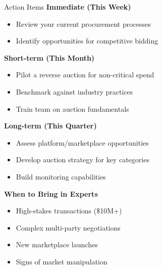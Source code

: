 \documentclass[xcolor={x11names}]{beamer}
\begin{document}
\begin{frame}{Action Items}
\textbf{Immediate (This Week)}
\begin{itemize}
  \item Review your current procurement processes
  \item Identify opportunities for competitive bidding
\end{itemize}


\textbf{Short-term (This Month)}
\begin{itemize}
  \item Pilot a reverse auction for non-critical spend
  \item Benchmark against industry practices
  \item Train team on auction fundamentals
\end{itemize}


\textbf{Long-term (This Quarter)}
\begin{itemize}
  \item Assess platform/marketplace opportunities
  \item Develop auction strategy for key categories
  \item Build monitoring capabilities
\end{itemize}


\textbf{When to Bring in Experts}
\begin{itemize}
  \item High-stakes transactions (\$10M+)
  \item Complex multi-party negotiations
  \item New marketplace launches
  \item Signs of market manipulation
\end{itemize}
\end{frame}
\end{document}
